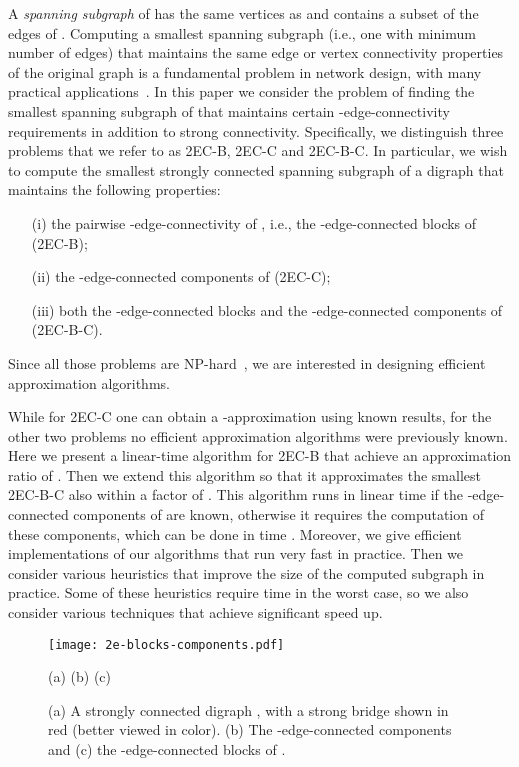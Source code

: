 \documentclass[11pt]{article}
\begin{document}
A \emph{spanning subgraph}  of  has the same vertices as  and contains a subset of the edges of .
Computing a smallest
spanning subgraph (i.e., one with minimum number of edges)
that maintains the same edge or vertex connectivity properties of the original graph is a fundamental problem in network design, with many practical applications~\cite{connectivity:nagamochi-ibaraki}.
In this paper we consider the problem of finding the smallest spanning subgraph of  that
maintains  certain -edge-connectivity requirements in addition to strong connectivity.
Specifically, we distinguish three problems that we refer to as \textsf{2EC-B}, \textsf{2EC-C} and \textsf{2EC-B-C}. In particular, we wish to compute the smallest strongly connected spanning subgraph of a digraph  that maintains the following properties:
\begin{itemize}
\item[(i)] the pairwise -edge-connectivity of , i.e., the -edge-connected blocks of  (\textsf{2EC-B});
\item[(ii)] the -edge-connected components of  (\textsf{2EC-C});
\item[(iii)] both the -edge-connected blocks and the -edge-connected components of  (\textsf{2EC-B-C}).
\end{itemize}
Since all those problems are NP-hard~\cite{GJ:NP},  we are interested in designing efficient approximation algorithms.

While for \textsf{2EC-C} one can obtain a -approximation using known results, for the other two problems no efficient approximation algorithms were previously known.
Here we present a linear-time algorithm for \textsf{2EC-B} that achieve an approximation ratio of .
Then we extend this algorithm so that it approximates the smallest \textsf{2EC-B-C} also within a factor of .
This algorithm runs in linear time if the -edge-connected components of  are known, otherwise it requires the computation of these components, which can be done in  time \cite{2CC:HenzingerKL14}.
Moreover, we give efficient implementations of our algorithms that run very fast in practice.
Then we consider various heuristics that improve the size of the computed subgraph in practice.
Some of these heuristics require  time in the worst case, so we also consider various techniques that achieve significant speed up.


\begin{figure}[t]
\begin{center}
\texttt{[image: 2e-blocks-components.pdf]}
\end{center}
\vspace{-0.2cm}
\hspace{2cm} (a)  \hspace{3.2cm} (b)  \hspace{3.2cm}  (c) 
\caption{(a) A strongly connected digraph , with a strong bridge shown in red (better viewed in color).
(b) The -edge-connected components and (c)
the -edge-connected
blocks of .}
\label{fig:2ebc}
\end{figure}
\end{document}
